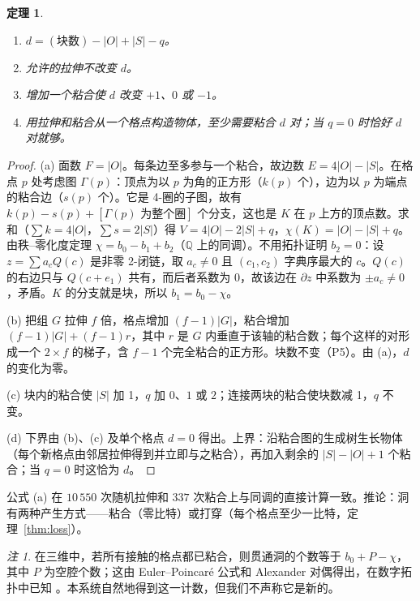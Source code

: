 \documentclass[11pt,a4paper]{article}
\theoremstyle{plain}
\newtheorem{theorem}{定理}
\theoremstyle{definition}
\theoremstyle{remark}
\newtheorem*{remark}{注}
\begin{document}
\begin{theorem}\label{thm:holes}
\begin{enumerate}[label=\upshape(\alph*)]
\item $d=(\text{块数})-|O|+|S|-q$。
\item 允许的拉伸不改变 $d$。
\item 增加一个粘合使 $d$ 改变 $+1$、$0$ 或 $-1$。
\item 用拉伸和粘合从一个格点构造物体，至少需要粘合 $d$ 对；当 $q=0$ 时恰好 $d$ 对就够。
\end{enumerate}
\end{theorem}
\begin{proof}
(a) 面数 $F=|O|$。每条边至多参与一个粘合，故边数 $E=4|O|-|S|$。在格点 $p$ 处考虑图 $\Gamma(p)$：顶点为以 $p$ 为角的正方形（$k(p)$ 个），边为以 $p$ 为端点的粘合边（$s(p)$ 个）。它是 4-圈的子图，故有 $k(p)-s(p)+[\Gamma(p)\text{ 为整个圈}]$ 个分支，这也是 $K$ 在 $p$ 上方的顶点数。求和（$\sum k=4|O|$，$\sum s=2|S|$）得 $V=4|O|-2|S|+q$，$\chi(K)=|O|-|S|+q$。由秩–零化度定理 $\chi=b_0-b_1+b_2$（$\mathbb Q$ 上的同调）。不用拓扑证明 $b_2=0$：设 $z=\sum a_cQ(c)$ 是非零 2-闭链，取 $a_c\ne0$ 且 $(c_1,c_2)$ 字典序最大的 $c$。$Q(c)$ 的右边只与 $Q(c+e_1)$ 共有，而后者系数为 $0$，故该边在 $\partial z$ 中系数为 $\pm a_c\ne0$，矛盾。$K$ 的分支就是块，所以 $b_1=b_0-\chi$。

(b) 把组 $G$ 拉伸 $f$ 倍，格点增加 $(f-1)|G|$，粘合增加 $(f-1)|G|+(f-1)r$，其中 $r$ 是 $G$ 内垂直于该轴的粘合数；每个这样的对形成一个 $2\times f$ 的梯子，含 $f-1$ 个完全粘合的正方形。块数不变（P5）。由 (a)，$d$ 的变化为零。

(c) 块内的粘合使 $|S|$ 加 1，$q$ 加 $0$、$1$ 或 $2$；连接两块的粘合使块数减 1，$q$ 不变。

(d) 下界由 (b)、(c) 及单个格点 $d=0$ 得出。上界：沿粘合图的生成树生长物体（每个新格点由邻居拉伸得到并立即与之粘合），再加入剩余的 $|S|-|O|+1$ 个粘合；当 $q=0$ 时这恰为 $d$。
\end{proof}

公式 (a) 在 $10\,550$ 次随机拉伸和 $337$ 次粘合上与同调的直接计算一致。推论：洞有两种产生方式——粘合（零比特）或打穿（每个格点至少一比特，定理~\ref{thm:loss}）。

\begin{remark}
在三维中，若所有接触的格点都已粘合，则贯通洞的个数等于 $b_0+P-\chi$，其中 $P$ 为空腔个数；这由 Euler–Poincaré 公式和 Alexander 对偶得出，在数字拓扑中已知 \cite{toriwaki,kaczynski}。本系统自然地得到这一计数，但我们不声称它是新的。
\end{remark}
\end{document}

